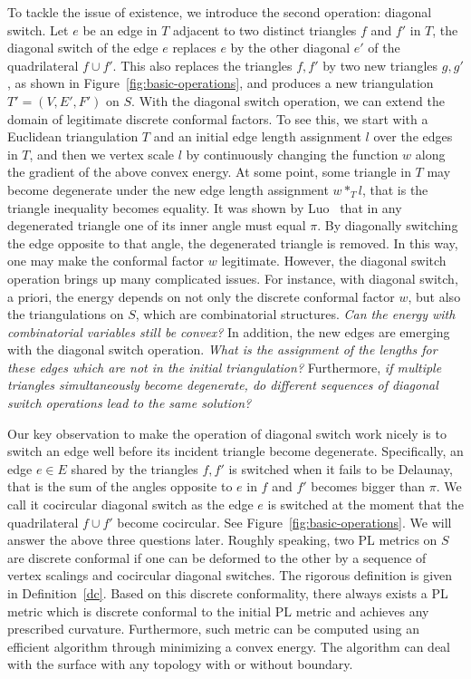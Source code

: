 \documentclass[11pt]{article}
\begin{document}
To tackle the issue of existence, we introduce the second operation: diagonal switch. 
Let $e$ be an edge in $T$ adjacent to two distinct triangles $f$ and $f'$ in $T$, 
the diagonal switch of the edge $e$ replaces $e$ by the other diagonal $e'$
of the quadrilateral $f \cup f'$. This also replaces the triangles $f, f'$ by two new triangles
$g, g'$, as shown in Figure~\ref{fig:basic-operations}, and produces a new triangulation $T'=(V, E', F')$ 
on $S$.  With the diagonal switch operation, 
we can extend the domain of legitimate discrete conformal factors. To see this, we start with a Euclidean
triangulation $T$ and an initial edge length assignment $l$ over the edges in $T$, and 
then we vertex scale $l$ by continuously changing the function $w$ along the gradient of the 
above convex energy. At some point, some triangle in $T$ may become degenerate under the new 
edge length assignment $w*_T l$, that is the triangle inequality becomes equality. 
It was shown by Luo~\cite{luo} that in any degenerated triangle one of its inner angle must equal $\pi$. 
By diagonally switching the edge opposite to that angle, the degenerated triangle is removed. 
In this way, one may make the conformal 
factor $w$ legitimate. However, the diagonal switch operation brings up many complicated issues. 
For instance, with diagonal switch, a priori, the energy depends on not only the discrete conformal 
factor $w$, but also the triangulations on $S$, which are combinatorial structures. 
{\it Can the energy with combinatorial variables still be convex?}
In addition, the new edges are emerging with the diagonal switch operation. 
{\it What is the assignment of the lengths for these edges which are not in the 
initial triangulation?}
Furthermore, {\it if multiple triangles simultaneously become degenerate, 
do different sequences of diagonal switch operations lead to the same solution?}

Our key observation to make the operation of diagonal switch work nicely is to switch an edge 
well before its incident triangle become degenerate. Specifically, an edge $e\in E$ shared by the triangles $f, f'$
is switched when it fails to be Delaunay, that is the sum of the angles opposite to $e$ in $f$ and $f'$
becomes bigger than $\pi$. We call it cocircular diagonal switch 
as the edge $e$ is switched at the moment that the quadrilateral $f\cup f'$ 
become cocircular. See Figure~\ref{fig:basic-operations}.
We will answer the above three questions later. 
Roughly speaking,  two PL metrics on $S$ are discrete conformal if one can be deformed to the other by a sequence of vertex 
scalings and cocircular diagonal switches. The rigorous definition is given in Definition~\ref{dc}. Based on this discrete
conformality, there always exists a PL metric which is discrete conformal to the initial PL metric and 
achieves any prescribed curvature. Furthermore, such metric can be computed using an efficient algorithm through
minimizing a convex energy. The algorithm can deal with the surface with any topology with or without boundary. 
\end{document}
